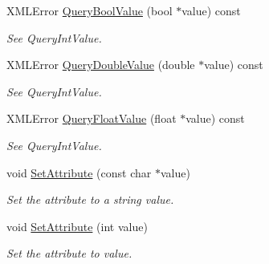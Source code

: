 \begin{DoxyCompactItemize}
\mbox{\label{classtinyxml2_1_1_x_m_l_attribute_a5f32e038954256f61c21ff20fd13a09c}} 
X\+M\+L\+Error \hyperlink{classtinyxml2_1_1_x_m_l_attribute_a5f32e038954256f61c21ff20fd13a09c}{Query\+Bool\+Value} (bool $\ast$value) const
\begin{DoxyCompactList}\small\item\em See Query\+Int\+Value. \end{DoxyCompactList}\item 
\mbox{\label{classtinyxml2_1_1_x_m_l_attribute_a2aa6e55e8ea03af0609cf6690bff79b9}} 
X\+M\+L\+Error \hyperlink{classtinyxml2_1_1_x_m_l_attribute_a2aa6e55e8ea03af0609cf6690bff79b9}{Query\+Double\+Value} (double $\ast$value) const
\begin{DoxyCompactList}\small\item\em See Query\+Int\+Value. \end{DoxyCompactList}\item 
\mbox{\label{classtinyxml2_1_1_x_m_l_attribute_a049dea6449a6259b6cfed44a9427b607}} 
X\+M\+L\+Error \hyperlink{classtinyxml2_1_1_x_m_l_attribute_a049dea6449a6259b6cfed44a9427b607}{Query\+Float\+Value} (float $\ast$value) const
\begin{DoxyCompactList}\small\item\em See Query\+Int\+Value. \end{DoxyCompactList}\item 
\mbox{\label{classtinyxml2_1_1_x_m_l_attribute_a406d2c4a13c7af99a65edb59dd9f7581}} 
void \hyperlink{classtinyxml2_1_1_x_m_l_attribute_a406d2c4a13c7af99a65edb59dd9f7581}{Set\+Attribute} (const char $\ast$value)
\begin{DoxyCompactList}\small\item\em Set the attribute to a string value. \end{DoxyCompactList}\item 
\mbox{\label{classtinyxml2_1_1_x_m_l_attribute_ad86d7d7058d76761c3a80662566a57e5}} 
void \hyperlink{classtinyxml2_1_1_x_m_l_attribute_ad86d7d7058d76761c3a80662566a57e5}{Set\+Attribute} (int value)
\begin{DoxyCompactList}\small\item\em Set the attribute to value. \end{DoxyCompactList}\item 

\end{DoxyCompactItemize}
